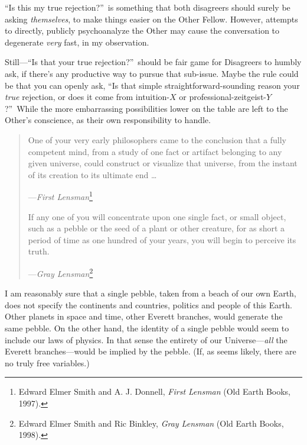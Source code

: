 {
 ``Is this my true rejection?''~is something that both disagreers should surely be asking
\textit{themselves}, to make things easier on the Other Fellow.
However, attempts to directly, publicly psychoanalyze the Other may
cause the conversation to degenerate \textit{very} fast, in my
observation.}

{
 Still---``Is that your true
rejection?''~should be fair game for Disagreers to
humbly ask, if there's any productive way to pursue
that sub-issue. Maybe the rule could be that you can openly ask,
``Is that simple straightforward-sounding reason your
\textit{true} rejection, or does it come from intuition-$X$ or
professional-zeitgeist-$Y$?''~While the more
embarrassing possibilities lower on the table are left to the
Other's conscience, as their own responsibility to
handle.}

\myendsectiontext


\begin{quote}
{
 One of your very early philosophers came to the conclusion that a
fully competent mind, from a study of one fact or artifact belonging to
any given universe, could construct or visualize that universe, from
the instant of its creation to its ultimate end \ldots}

{\raggedleft
 {}---\textit{First Lensman}\footnote{Edward Elmer Smith and A. J. Donnell, \textit{First Lensman}
(Old Earth Books, 1997).}
\par}


{
 If any one of you will concentrate upon one single fact, or small
object, such as a pebble or the seed of a plant or other creature, for
as short a period of time as one hundred of your years, you will begin
to perceive its truth.}

{\raggedleft
 {}---\textit{Gray Lensman}\footnote{Edward Elmer Smith and Ric Binkley, \textit{Gray Lensman} (Old
Earth Books, 1998).}
\par}
\end{quote}

{
 I am reasonably sure that a single pebble, taken from a beach of
our own Earth, does not specify the continents and countries, politics
and people of this Earth. Other planets in space and time, other
Everett branches, would generate the same pebble. On the other hand,
the identity of a single pebble would seem to include our laws of
physics. In that sense the entirety of our Universe---\textit{all} the
Everett branches---would be implied by the pebble. (If, as seems
likely, there are no truly free variables.)}

